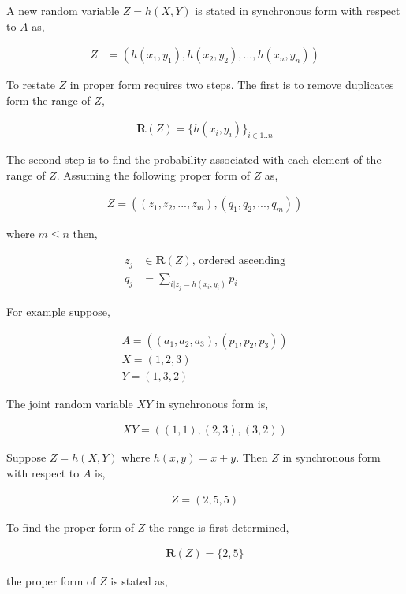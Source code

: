 A new random variable $Z = h(X,Y)$ is stated in synchronous form with respect to $A$ as,

\begin{align*}
Z &= (h(x_1, y_1), h(x_2, y_2), ..., h(x_n, y_n))
\end{align*}

To restate $Z$ in proper form requires two steps. The first is to remove duplicates form the range of $Z$,

\begin{align*}
\mathbf{R}(Z) = \{h(x_i, y_i)\}_{i \in 1..n}
\end{align*}

The second step is to find the probability associated with each element of the range of $Z$. Assuming the following proper form of $Z$ as,

\begin{align*}
Z = ((z_1, z_2, ..., z_m), (q_1, q_2, ..., q_m))
\end{align*}

where $m \le n$ then,

\begin{align*}
z_j &\in \mathbf{R}(Z) \text{, ordered ascending}\\
q_j &= \sum_{i | z_j = h(x_i, y_i)}p_i
\end{align*}

For example suppose,

\begin{align*}
A = ((a_1,a_2,a_3),(p_1,p_2,p_3))\\
X = (1,2,3)\\
Y = (1,3,2)
\end{align*}

The joint random variable $XY$ in synchronous form is,

\begin{align*}
XY = ((1,1), (2,3),(3,2))
\end{align*}

Suppose $Z = h(X,Y)$ where $h(x,y) = x+y$. Then $Z$ in synchronous form with respect to $A$ is,

\begin{align*}
Z = (2, 5, 5)
\end{align*}

To find the proper form of $Z$ the range is first determined,

\begin{align*}
\mathbf{R}(Z) = \{2,5\}
\end{align*}

the proper form of $Z$ is stated as,

